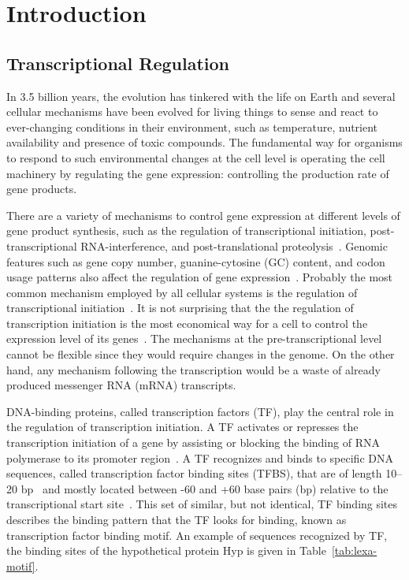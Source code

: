 
\chapter{Introduction}

\section{Transcriptional Regulation}

In 3.5 billion years, the evolution has tinkered with the life on Earth and
several cellular mechanisms have been evolved for living things to sense and
react to ever-changing conditions in their environment, such as temperature,
nutrient availability and presence of toxic compounds. The fundamental way for
organisms to respond to such environmental changes at the cell level is
operating the cell machinery by regulating the gene expression: controlling the
production rate of gene products.

There are a variety of mechanisms to control gene expression at different
levels of gene product synthesis, such as the regulation of transcriptional
initiation, post-transcriptional RNA-interference, and post-translational
proteolysis~\cite{snyder2007molecular}. Genomic features such as gene copy
number, guanine-cytosine (GC) content, and codon usage patterns also affect the
regulation of gene expression~\cite{gustafsson2004codon,
  stranger2007relative}. Probably the most common mechanism employed by all
cellular systems is the regulation of transcriptional
initiation~\cite{browning2004regulation}. It is not surprising that the the
regulation of transcription initiation is the most economical way for a cell to
control the expression level of its genes~\cite{malacinski2005essentials}. The
mechanisms at the pre-transcriptional level cannot be flexible since they would
require changes in the genome. On the other hand, any mechanism following the
transcription would be a waste of already produced messenger RNA (mRNA)
transcripts.

DNA-binding proteins, called transcription factors (TF), play the central role
in the regulation of transcription initiation. A TF activates or represses the
transcription initiation of a gene by assisting or blocking the binding of RNA
polymerase to its promoter region~\cite{reznikoff1985regulation}. A TF
recognizes and binds to specific DNA sequences, called transcription factor
binding sites (TFBS), that are of length 10--20 bp~\cite{gerland2002physical,
  berg2004adaptive} and mostly located between -60 and +60 base pairs (bp)
relative to the transcriptional start site~\cite{collado1991control}. This set
of similar, but not identical, TF binding sites describes the binding pattern
that the TF looks for binding, known as transcription factor binding motif. An
example of sequences recognized by TF, the binding sites of the hypothetical
protein Hyp is given in Table~\ref{tab:lexa-motif}.

